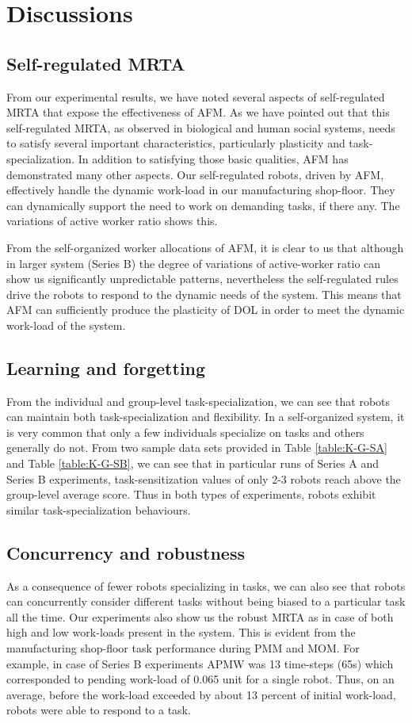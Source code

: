\documentclass[journal]{IEEEtran}
\begin{document}
\section{Discussions}
\label{sec:discuss}
\subsection{Self-regulated MRTA}
From our experimental results, we have noted several aspects of self-regulated MRTA that expose the effectiveness of AFM. As we have pointed out that this self-regulated MRTA, as observed in biological and human social systems, needs to satisfy several important characteristics, particularly plasticity and task-specialization. In addition to satisfying those basic qualities, AFM has demonstrated many other aspects. Our self-regulated robots, driven by AFM, effectively handle the dynamic work-load in our manufacturing shop-floor. They can dynamically support the need to work on demanding tasks, if there any. The variations of active worker ratio shows this. 

From the self-organized worker allocations of AFM, it is clear to us that although in larger system (Series B) the degree of variations of active-worker ratio can show us significantly unpredictable patterns, nevertheless the self-regulated rules drive the robots to respond to the dynamic needs of the system. This means that AFM can sufficiently produce the plasticity of DOL in order to meet the dynamic work-load of the system.
\subsection{Learning and forgetting} 
From the individual and group-level task-specialization, we can see that robots can maintain both task-specialization and flexibility. In a self-organized system, it is very common that only a few individuals specialize on tasks and others generally do not. From two sample data sets provided in Table \ref{table:K-G-SA} and Table \ref{table:K-G-SB}, we can see that in particular runs of Series A and Series B experiments, task-sensitization values of  only 2-3 robots reach above the group-level average score. Thus in both types of experiments, robots exhibit similar task-specialization behaviours. 
\subsection{Concurrency and robustness}
As a consequence of fewer robots specializing in tasks, we can also see that robots can concurrently  consider different tasks without being biased to a particular task all the time. Our experiments also show us the robust MRTA as in case of  both high and low work-loads present in the system. This is evident from the manufacturing shop-floor task performance during PMM and MOM. For example,  in case of Series B experiments APMW was 13 time-steps (65s) which corresponded  to pending work-load of 0.065 unit for a single robot. Thus, on an average, before the work-load exceeded by about 13 percent of initial work-load, robots were able to respond to  a task.
\end{document}
